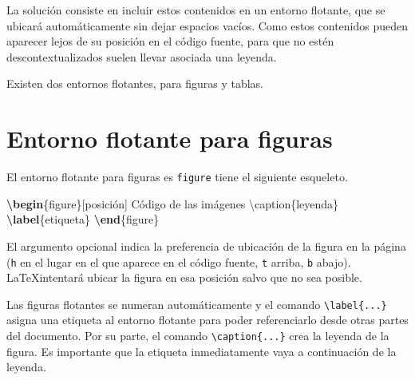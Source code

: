 \documentclass[
  a4paper,
]{scrreport}
\newenvironment{Shaded}{\begin{snugshade}}{\end{snugshade}}
\newcommand{\ExtensionTok}[1]{\textcolor[rgb]{0.00,0.23,0.31}{#1}}
\newcommand{\FunctionTok}[1]{\textcolor[rgb]{0.28,0.35,0.67}{#1}}
\newcommand{\KeywordTok}[1]{\textcolor[rgb]{0.00,0.23,0.31}{\textbf{#1}}}
\newcommand{\NormalTok}[1]{\textcolor[rgb]{0.00,0.23,0.31}{#1}}
\theoremstyle{definition}
\theoremstyle{remark}
\begin{document}
La solución consiste en incluir estos contenidos en un entorno flotante,
que se ubicará automáticamente sin dejar espacios vacíos. Como estos
contenidos pueden aparecer lejos de su posición en el código fuente,
para que no estén descontextualizados suelen llevar asociada una
leyenda.

Existen dos entornos flotantes, para figuras y tablas.

\section{Entorno flotante para
figuras}\label{entorno-flotante-para-figuras}

El entorno flotante para figuras es \texttt{figure} tiene el siguiente
esqueleto.

\begin{Shaded}
\begin{Highlighting}[]
\KeywordTok{\textbackslash{}begin}\NormalTok{\{}\ExtensionTok{figure}\NormalTok{\}[posición]}
\NormalTok{    Código de las imágenes}
\FunctionTok{\textbackslash{}caption}\NormalTok{\{leyenda\}}
\KeywordTok{\textbackslash{}label}\NormalTok{\{}\ExtensionTok{etiqueta}\NormalTok{\}}
\KeywordTok{\textbackslash{}end}\NormalTok{\{}\ExtensionTok{figure}\NormalTok{\}}
\end{Highlighting}
\end{Shaded}

El argumento opcional indica la preferencia de ubicación de la figura en
la página (\texttt{h} en el lugar en el que aparece en el código fuente,
\texttt{t} arriba, \texttt{b} abajo). \LaTeX intentará ubicar la figura
en esa posición salvo que no sea posible.

Las figuras flotantes se numeran automáticamente y el comando
\texttt{\textbackslash{}label\{...\}} asigna una etiqueta al entorno
flotante para poder referenciarlo desde otras partes del documento. Por
su parte, el comando \texttt{\textbackslash{}caption\{...\}} crea la
leyenda de la figura. Es importante que la etiqueta inmediatamente vaya
a continuación de la leyenda.
\end{document}
